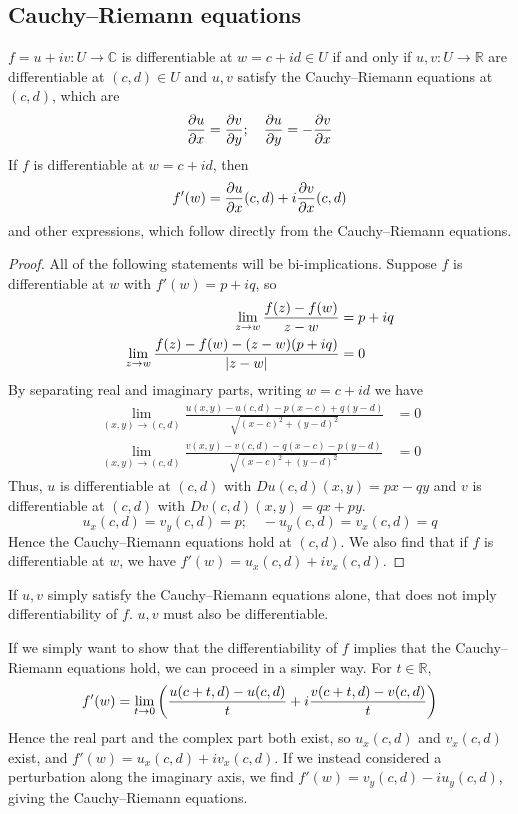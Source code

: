 \subsection{Cauchy--Riemann equations}
\begin{theorem}
	\( f = u + iv \colon U \to \mathbb C \) is differentiable at \( w = c + id \in U \) if and only if \( u,v \colon U \to \mathbb R \) are differentiable at \( (c,d) \in U \) and \( u,v \) satisfy the Cauchy--Riemann equations at \( (c,d) \), which are
	\[
		\pdv{u}{x} = \pdv{v}{y};\quad \pdv{u}{y} = -\pdv{v}{x}
	\]
	If \( f \) is differentiable at \( w = c + id \), then
	\[
		f'(w) = \pdv{u}{x}\qty(c,d) + i \pdv{v}{x}\qty(c,d)
	\]
	and other expressions, which follow directly from the Cauchy--Riemann equations.
\end{theorem}
\begin{proof}
	All of the following statements will be bi-implications.
	Suppose \( f \) is differentiable at \( w \) with \( f'(w) = p+iq \), so
	\begin{align*}
		\lim_{z \to w} \frac{f(z) - f(w)}{z-w}                     & = p+iq \\
		\lim_{z \to w} \frac{f(z) - f(w) - (z-w)(p+iq)}{\abs{z-w}} & = 0
	\end{align*}
	By separating real and imaginary parts, writing \( w = c + id \) we have
	\begin{align*}
		\lim_{(x,y) \to (c,d)} \frac{u(x,y) - u(c,d) - p(x-c) + q(y-d)}{\sqrt{(x-c)^2 + (y-d)^2}} & = 0 \\
		\lim_{(x,y) \to (c,d)} \frac{v(x,y) - v(c,d) - q(x-c) - p(y-d)}{\sqrt{(x-c)^2 + (y-d)^2}} & = 0
	\end{align*}
	Thus, \( u \) is differentiable at \( (c,d) \) with \( Du(c,d)(x,y) = px - qy \) and \( v \) is differentiable at \( (c,d) \) with \( Dv(c,d)(x,y) = qx + py \).
	\[
		u_x(c,d) = v_y(c,d) = p;\quad -u_y(c,d) = v_x(c,d) = q
	\]
	Hence the Cauchy--Riemann equations hold at \( (c,d) \).
	We also find that if \( f \) is differentiable at \( w \), we have \( f'(w) = u_x(c,d) + i v_x(c,d) \).
\end{proof}
\begin{remark}
	If \( u,v \) simply satisfy the Cauchy--Riemann equations alone, that does not imply differentiability of \( f \).
	\( u,v \) must also be differentiable.
\end{remark}
\begin{remark}
	If we simply want to show that the differentiability of \( f \) implies that the Cauchy--Riemann equations hold, we can proceed in a simpler way.
	For \( t \in \mathbb R \),
	\[
		f'(w) = \lim_{t \to 0} \qty(\frac{u(c+t,d) - u(c,d)}{t} + i \frac{v(c+t,d) - v(c,d)}{t})
	\]
	Hence the real part and the complex part both exist, so \( u_x(c,d) \) and \( v_x(c,d) \) exist, and \( f'(w) = u_x(c,d) + i v_x(c,d) \).
	If we instead considered a perturbation along the imaginary axis, we find \( f'(w) = v_y(c,d) - iu_y(c,d) \), giving the Cauchy--Riemann equations.
\end{remark}
